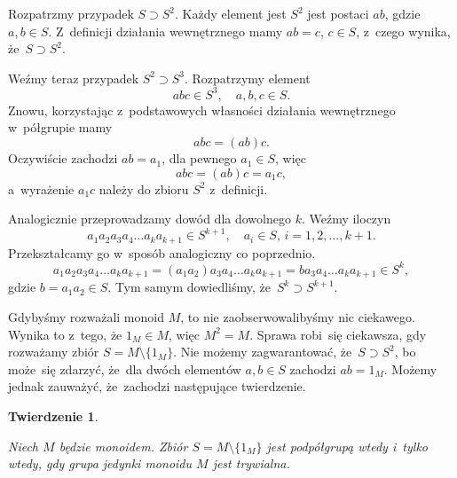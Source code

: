 \documentclass[a4paper,11pt]{article}
\newtheorem{theorem}{Twierdzenie}  %
\begin{document}
Rozpatrzmy przypadek $S \supset S^{ 2 }$. Każdy element jest $S^{ 2 }$ jest
postaci $ab$, gdzie $a, b \in S$. Z~definicji działania wewnętrznego
mamy $ab = c$, $c \in S$, z~czego wynika, że~$S \supset S^{ 2 }$.

Weźmy teraz przypadek $S^{ 2 } \supset S^{ 3 }$. Rozpatrzymy element
\begin{equation}
  \label{eq:Forys-Forys-27}
  abc \in S^{ 3 }, \quad a, b, c \in S.
\end{equation}
Znowu, korzystając z~podstawowych własności działania wewnętrznego
w~półgrupie mamy
\begin{equation}
  \label{eq:Forys-Forys-28}
  abc = ( ab ) c.
\end{equation}
Oczywiście zachodzi $ab = a_{ 1 }$, dla pewnego $a_{ 1 } \in S$, więc
\begin{equation}
  \label{eq:Forys-Forys-29}
  abc = ( ab ) c = a_{ 1 } c,
\end{equation}
a~wyrażenie $a_{ 1 } c$ należy do zbioru $S^{ 2 }$ z~definicji.

Analogicznie przeprowadzamy dowód dla dowolnego $k$. Weźmy iloczyn
\begin{equation}
  \label{eq:Forys-Forys-30}
  a_{ 1 } a_{ 2 } a_{ 3 } a_{ 4 } \ldots a_{ k } a_{ k + 1 } \in S^{ k + 1 }, \quad
  a_{ i } \in S,\, i = 1, 2, \ldots, k + 1.
\end{equation}
Przekształcamy go w~sposób analogiczny co poprzednio.
\begin{equation}
  \label{eq:Forys-Forys-31}
  a_{ 1 } a_{ 2 } a_{ 3 } a_{ 4 } \ldots a_{ k } a_{ k + 1 } =
  ( a_{ 1 } a_{ 2 } ) a_{ 3 } a_{ 4 } \ldots a_{ k } a_{ k + 1 } =
  b a_{ 3 } a_{ 4 } \ldots a_{ k } a_{ k + 1 } \in S^{ k },
\end{equation}
gdzie $b = a_{ 1 } a_{ 2 } \in S$. Tym samym dowiedliśmy,
że~$S^{ k } \supset S^{ k + 1 }$.

Gdybyśmy rozważali monoid $M$, to nie zaobserwowalibyśmy nic
ciekawego. Wynika to z~tego, że $1_{ M } \in M$, więc $M^{ 2 } = M$.
Sprawa robi~się ciekawsza, gdy rozważamy zbiór
$S = M \setminus \{ 1_{ M } \}$. Nie możemy zagwarantować,
że~$S \supset S^{ 2 }$, bo może~się zdarzyć, że~dla dwóch elementów
$a, b \in S$ zachodzi $a b = 1_{ M }$. Możemy jednak zauważyć,
że~zachodzi następujące twierdzenie.





\begin{theorem}
  \label{thm:Forys-Forys-01}

  Niech $M$ będzie monoidem. Zbiór $S = M \setminus \{ 1_{ M } \}$ jest
  podpółgrupą wtedy i~tylko wtedy, gdy grupa jedynki monoidu $M$ jest
  trywialna.

\end{theorem}
\end{document}
